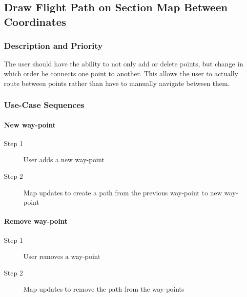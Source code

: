 \documentclass[12pt, letterpaper]{article}
\begin{document}
      \subsection{Draw Flight Path on Section Map Between Coordinates}
        \subsubsection{Description and Priority}
        		The user should have the ability to not only add or delete points, but change in which
        		order he connects one point to another. This allows the user to actually route between
            points rather than have to manually navigate between them.
        \subsubsection{Use-Case Sequences}
        \paragraph{New way-point}
          \begin{description}

            \item[Step 1] User adds a new way-point \\
            \item[Step 2] Map updates to create a path from the previous way-point to new way-point\\
          \end{description}
              \paragraph{Remove way-point}
              \begin{description}
                \item[Step 1] User removes a way-point\\
            \item[Step 2] Map updates to remove the path from the way-points\\
          \end{description}
\end{document}

